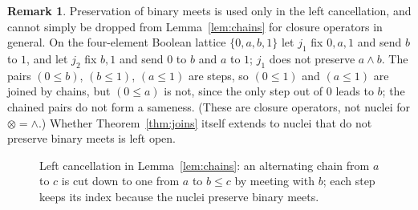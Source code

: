 \documentclass[11pt]{amsart}
\theoremstyle{definition}
\newtheorem{rem}[thm]{Remark}
\begin{document}
\begin{rem}
Preservation of binary meets is used only in the left cancellation, and
cannot simply be dropped from Lemma~\ref{lem:chains} for closure operators
in general. On the four-element Boolean lattice $\{0,a,b,1\}$ let $j_1$ fix
$0,a,1$ and send $b$ to $1$, and let $j_2$ fix $b,1$ and send $0$ to $b$
and $a$ to $1$; $j_1$ does not preserve $a\wedge b$. The pairs $(0\le b)$,
$(b\le1)$, $(a\le1)$ are steps, so $(0\le1)$ and $(a\le1)$ are joined by
chains, but $(0\le a)$ is not, since the only step out of $0$ leads to $b$;
the chained pairs do not form a sameness. (These are closure operators,
not nuclei for $\otimes=\wedge$.) Whether Theorem~\ref{thm:joins} itself
extends to nuclei that do not preserve binary meets is left open.
\end{rem}

\begin{figure}[ht]
\centering
{}
\caption{Left cancellation in Lemma~\ref{lem:chains}: an alternating chain
from $a$ to $c$ is cut down to one from $a$ to $b\le c$ by meeting with $b$;
each step keeps its index because the nuclei preserve binary meets.}
\label{fig:cut}
\end{figure}
\end{document}
